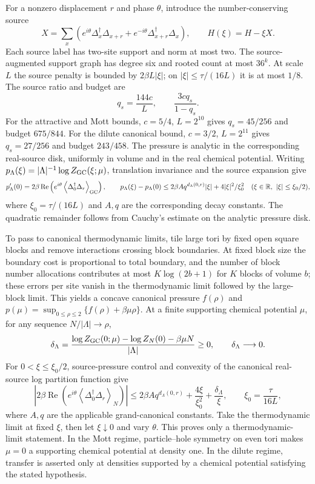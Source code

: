 \documentclass[11pt]{article}
\newcommand{\Deltaop}{\Delta}
\begin{document}
For a nonzero displacement $r$ and phase $\theta$, introduce the number-conserving source
\[
 X=\sum_x\left(e^{i\theta}\Deltaop_x^\dagger\Deltaop_{x+r}
       +e^{-i\theta}\Deltaop_{x+r}^\dagger\Deltaop_x\right),
 \qquad H(\xi)=H-\xi X.
\]
Each source label has two-site support and norm at most two. The source-augmented support graph has degree six and rooted count at most $36^k$. At scale $L$ the source penalty is bounded by $2\beta L|\xi|$; on $|\xi|\le\tau/(16L)$ it is at most $1/8$. The source ratio and budget are
\[
 q_s=\frac{144c}{L},\qquad \frac{3cq_s}{1-q_s}.
\]
For the attractive and Mott bounds, $c=5/4$, $L=2^{10}$ gives $q_s=45/256$ and budget $675/844$. For the dilute canonical bound, $c=3/2$, $L=2^{11}$ gives $q_s=27/256$ and budget $243/458$. The pressure is analytic in the corresponding real-source disk, uniformly in volume and in the real chemical potential.
Writing $p_\Lambda(\xi)=|\Lambda|^{-1}\log Z_{\rm GC}(\xi;\mu)$, translation invariance and the source expansion give
\[
 p_\Lambda'(0)=2\beta\operatorname{Re}\left(e^{i\theta}
 \left\langle\Deltaop_0^\dagger\Deltaop_r\right\rangle_{\rm GC}\right),
 \qquad
 p_\Lambda(\xi)-p_\Lambda(0)
 \le2\beta A q^{d_\Lambda(0,r)}|\xi|
       +4|\xi|^2/\xi_0^2
 \quad (\xi\in\mathbb R,\ |\xi|\le\xi_0/2),
\]
where $\xi_0=\tau/(16L)$ and $A,q$ are the corresponding decay constants. The quadratic remainder follows from Cauchy's estimate on the analytic pressure disk.

To pass to canonical thermodynamic limits, tile large tori by fixed open square blocks and remove interactions crossing block boundaries. At fixed block size the boundary cost is proportional to total boundary, and the number of block number allocations contributes at most $K\log(2b+1)$ for $K$ blocks of volume $b$; these errors per site vanish in the thermodynamic limit followed by the large-block limit. This yields a concave canonical pressure $f(\rho)$ and $p(\mu)=\sup_{0\le\rho\le2}\{f(\rho)+\beta\mu\rho\}$. At a finite supporting chemical potential $\mu$, for any sequence $N/|\Lambda|\to\rho$,
\[
 \delta_\Lambda=\frac{\log Z_{\rm GC}(0;\mu)-\log Z_N(0)-\beta\mu N}{|\Lambda|}\ge0,
 \qquad \delta_\Lambda\longrightarrow0.
\]
For $0<\xi\le\xi_0/2$, source-pressure control and convexity of the canonical real-source log partition function give
\[
 \left|2\beta\operatorname{Re}\left(e^{i\theta}
 \left\langle\Deltaop_0^\dagger\Deltaop_r\right\rangle_N\right)\right|
 \le 2\beta A q^{d_\Lambda(0,r)}+\frac{4\xi}{\xi_0^2}
       +\frac{\delta_\Lambda}{\xi},
 \qquad \xi_0=\frac{\tau}{16L},
\]
where $A,q$ are the applicable grand-canonical constants. Take the thermodynamic limit at fixed $\xi$, then let $\xi\downarrow0$ and vary $\theta$. This proves only a thermodynamic-limit statement. In the Mott regime, particle–hole symmetry on even tori makes $\mu=0$ a supporting chemical potential at density one. In the dilute regime, transfer is asserted only at densities supported by a chemical potential satisfying the stated hypothesis.
\end{document}
